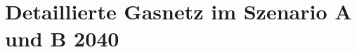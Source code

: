 \documentclass[review]{elsarticle}
\begin{document}
\section{Detaillierte Gasnetz im Szenario A und B 2040}\label{app_results_2040_extension}
%
%
\end{document}
